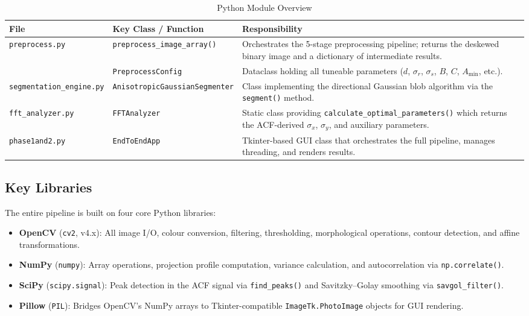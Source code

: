 \documentclass[12pt, a4paper]{article}
\begin{document}
\begin{table}[H]
\centering
\caption{Python Module Overview}
\label{tab:modules}
\begin{tabular}{@{}llp{6.5cm}@{}}
\toprule
\textbf{File} & \textbf{Key Class / Function} & \textbf{Responsibility} \\
\midrule
\texttt{preprocess.py} & \texttt{preprocess\_image\_array()} & Orchestrates the 5-stage preprocessing pipeline; returns the deskewed binary image and a dictionary of intermediate results. \\
 & \texttt{PreprocessConfig} & Dataclass holding all tuneable parameters ($d$, $\sigma_r$, $\sigma_s$, $B$, $C$, $A_{\min}$, etc.). \\
\midrule
\texttt{segmentation\_engine.py} & \texttt{AnisotropicGaussianSegmenter} & Class implementing the directional Gaussian blob algorithm via the \texttt{segment()} method. \\
\midrule
\texttt{fft\_analyzer.py} & \texttt{FFTAnalyzer} & Static class providing \texttt{calculate\_optimal\_parameters()} which returns the ACF-derived $\sigma_x$, $\sigma_y$, and auxiliary parameters. \\
\midrule
\texttt{phase1and2.py} & \texttt{EndToEndApp} & Tkinter-based GUI class that orchestrates the full pipeline, manages threading, and renders results. \\
\bottomrule
\end{tabular}
\end{table}

\subsection{Key Libraries}

The entire pipeline is built on four core Python libraries:

\begin{itemize}
    \item \textbf{OpenCV} (\texttt{cv2}, v4.x): All image I/O, colour conversion, filtering, thresholding, morphological operations, contour detection, and affine transformations.
    \item \textbf{NumPy} (\texttt{numpy}): Array operations, projection profile computation, variance calculation, and autocorrelation via \texttt{np.correlate()}.
    \item \textbf{SciPy} (\texttt{scipy.signal}): Peak detection in the ACF signal via \texttt{find\_peaks()} and Savitzky--Golay smoothing via \texttt{savgol\_filter()}.
    \item \textbf{Pillow} (\texttt{PIL}): Bridges OpenCV's NumPy arrays to Tkinter-compatible \texttt{ImageTk.PhotoImage} objects for GUI rendering.
\end{itemize}
\end{document}
